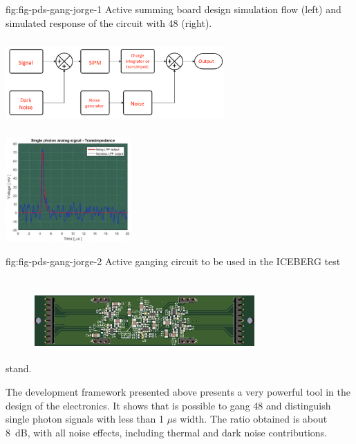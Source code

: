 \begin{dunefigure}
 {fig:fig-pds-gang-jorge-1}
 {Active summing board design simulation flow (left) and simulated response of the circuit with 48 (right).}
\includegraphics[angle=0,width=8.4cm,height=4cm]{graphics/pds-gang-jorge-2.png}
\includegraphics[height=4cm]{graphics/pds-gang-jorge-3.png}
\end{dunefigure}

\begin{dunefigure}
 {fig:fig-pds-gang-jorge-2}
 {Active ganging circuit to be used in the ICEBERG test stand.}
\includegraphics[angle=0,width=8.4cm,height=4cm]{graphics/pds-gang-jorge-4.png}
\end{dunefigure}

The development framework presented above presents a very powerful tool in the design of the electronics. It shows that is possible to gang 48  and distinguish single photon signals with less than 1 $\mu$s width.
The  ratio obtained is about \SI{8}{dB}, with all noise effects, including thermal and dark noise contributions.

